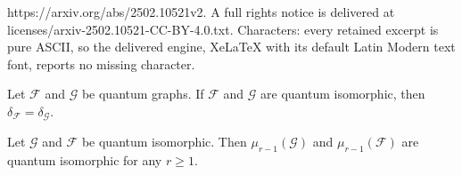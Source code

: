 \documentclass[10pt,a4paper]{amsart}
\begin{document}
https://arxiv.org/abs/2502.10521v2. A full rights notice is delivered at licenses/arxiv-2502.10521-CC-BY-4.0.txt. Characters: every retained excerpt is pure ASCII, so the delivered engine, XeLaTeX with its default Latin Modern text font, reports no missing character.
\begin{proposition}\label{prop:deltas}
Let $\mathcal{F}$ and $\mathcal{G}$ be quantum graphs. If $\mathcal{F}$ and $\mathcal{G}$ are quantum isomorphic, then $\delta_{\scriptscriptstyle\mathcal{F}}=\delta_{\scriptscriptstyle\mathcal{G}}$.
\end{proposition}

\begin{proposition}%
Let $\mathcal{G}$ and $\mathcal{F}$ be quantum isomorphic. Then $\mu_{r-1}(\mathcal{G})$ and $\mu_{r-1}(\mathcal{F})$ are quantum isomorphic for any $r\geq 1$.
\end{proposition}
\end{document}

